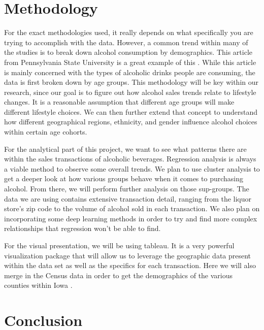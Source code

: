 \documentclass{article}
\begin{document}
\section{Methodology}
For the exact methodologies used, it really depends on what specifically you are trying to accomplish with the data. However, a common trend within many of the studies is to break down alcohol consumption by demographics. This article from Pennsylvania State University is a great example of this \cite{penn_state_extension}. While this article is mainly concerned with the types of alcoholic drinks people are consuming, the data is first broken down by age groups. This methodology will be key within our research, since our goal is to figure out how alcohol sales trends relate to lifestyle changes. It is a reasonable assumption that different age groups will make different lifestyle choices. We can then further extend that concept to understand how different geographical regions, ethnicity, and gender influence alcohol choices within certain age cohorts. 

For the analytical part of this project, we want to see what patterns there are within the sales transactions of alcoholic beverages. Regression analysis is always a viable method to observe some overall trends. We plan to use cluster analysis to get a deeper look at how various groups behave when it comes to purchasing alcohol. From there, we will perform further analysis on those sup-groups. The data we are using contains extensive transaction detail, ranging from the liquor store's zip code to the volume of alcohol sold in each transaction. We also plan on incorporating some deep learning methods in order to try and find more complex relationships that regression won't be able to find.

For the visual presentation, we will be using tableau. It is a very powerful visualization package that will allow us to leverage the geographic data present within the data set as well as the specifics for each transaction. Here we will also merge in the Census data in order to get the demographics of the various counties within Iowa \cite{census}.

\section{Conclusion}
\end{document}
